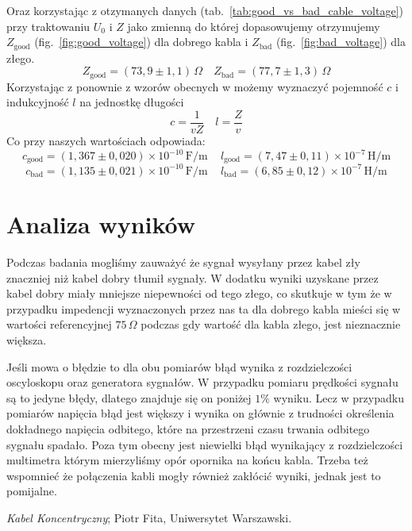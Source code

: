 \documentclass[12pt]{article}
\begin{document}
Oraz korzystając z otzymanych danych (tab.~\ref{tab:good_vs_bad_cable_voltage}) przy traktowaniu \(U_0\) i \(Z\) jako zmienną do której dopasowujemy otrzymujemy \(Z_{\mathrm{good}}\) (fig.~\ref{fig:good_voltage}) dla dobrego kabla i \(Z_{\mathrm{bad}}\) (fig.~\ref{fig:bad_voltage}) dla złego.
\[
	Z_{\mathrm{good}} = (73{,}9 \pm 1{,}1) \, \Omega \quad
	Z_{\mathrm{bad}} = (77{,}7 \pm 1{,}3) \, \Omega
\]
Korzystając z ponownie z wzorów obecnych w \cite{skrypt} możemy wyznaczyć pojemność \(c\) i indukcyjność \(l\) na jednostkę długości
\[
	c = \frac{1}{v Z} \quad l = \frac{Z}{v}
\]
Co przy naszych wartościach odpowiada:
\[
	c_{\mathrm{good}} = (1{,}367 \pm 0{,}020) \times 10^{-10} \, \mathrm{F/m} \, \quad l_{\mathrm{good}} = (7{,}47 \pm 0{,}11) \times 10^{-7} \, \mathrm{H/m}
\]
\[
	c_{\mathrm{bad}} = (1{,}135 \pm 0{,}021) \times 10^{-10} \, \mathrm{F/m} \, \quad l_{\mathrm{bad}} = (6{,}85 \pm 0{,}12) \times 10^{-7} \, \mathrm{H/m}
\]

\section{Analiza wyników}
Podczas badania mogliśmy zauważyć że sygnał wysyłany przez kabel zły znaczniej niż kabel dobry tłumił sygnały. W dodatku wyniki uzyskane przez kabel dobry miały mniejsze niepewności od tego złego, co skutkuje w tym że w przypadku impedencji wyznaczonych przez nas ta dla dobrego kabla mieści się w wartości referencyjnej \(75 \, \Omega\) podczas gdy wartość dla kabla złego, jest nieznacznie większa.

Jeśli mowa o błędzie to dla obu pomiarów błąd wynika z rozdzielczości oscyloskopu oraz generatora sygnałów. W przypadku pomiaru prędkości sygnału są to jedyne błędy, dlatego znajduje się on poniżej \(1 \%\) wyniku. Lecz w przypadku pomiarów napięcia błąd jest większy i wynika on głównie z trudności określenia dokładnego napięcia odbitego, które na przestrzeni czasu trwania odbitego sygnału spadało. Poza tym obecny jest niewielki błąd wynikający z rozdzielczości multimetra którym mierzyliśmy opór opornika na końcu kabla. Trzeba też wspomnieć że połączenia kabli mogły również zakłócić wyniki, jednak jest to pomijalne.

\begin{thebibliography}{1}

	\emph{Kabel Koncentryczny}; Piotr Fita, Uniwersytet Warszawski.

\end{thebibliography}
\end{document}
